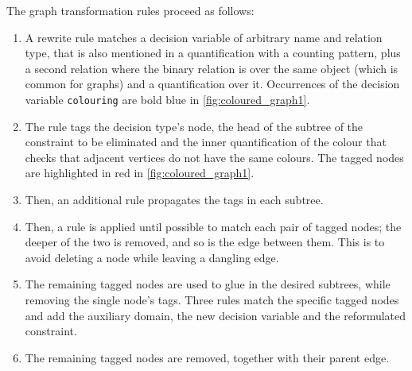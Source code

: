 \documentclass[anonymous,a4paper,UKenglish,cleveref,pdfa]{lipics-v2021}
\newcommand{\zap}[1]{}
\newcommand{\code}[1]{{\small\texttt{{#1}}}}
\begin{document}
\zap{After further evaluations of the specification it was noted that as the number of colours for each vertex is the same for all vertices, the colours assigned to each vertex could be expressed as a set of fixed size. The decision variable, originally a relation, was then substituted by a function that maps each node to its set of colours. This allowed simplifying the two constraints into one constraint, leading to a more compact class model.
Moreover, the second specification performs vastly better than the first. It has therefore been chosen as an ideal case study for our method that aims to produce general rules that automatically rewrite one model into the other.
}
The graph transformation rules proceed as follows:
\begin{enumerate}
    \item A rewrite rule matches a decision variable of arbitrary name and relation type, that is also mentioned in a quantification with a counting pattern, plus a second relation where the binary relation is over the same object (which is common for graphs) and a quantification over it.
    Occurrences of the decision variable \code{colouring} are bold blue in \cref{fig:coloured_graph1}.
    \item The rule tags the decision type's node, the head of the subtree of the constraint to be eliminated and the inner quantification of the colour that checks that adjacent vertices do not have the same colours.
    The tagged nodes are highlighted in red in \cref{fig:coloured_graph1}.
    \item Then, an additional rule propagates the tags in each subtree. 
    \item Then, a rule is applied until possible to match each pair of tagged nodes; the deeper of the two is removed, and so is the edge between them. This is to avoid deleting a node while leaving a dangling edge.
    \item The remaining tagged nodes are used to glue in the desired subtrees, while removing the single node's tags. Three rules match the specific tagged nodes and add the auxiliary domain, the new decision variable and the reformulated constraint.
    \item The remaining tagged nodes are removed, together with their parent edge.
\end{enumerate}
\end{document}
